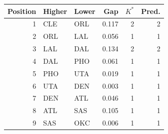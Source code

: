 \begin{tabular}{rllrrr}
\toprule
Position & Higher & Lower & Gap & $K^*$ & Pred. \\
\midrule
1 & CLE & ORL & 0.117 & 2 & 2 \\
2 & ORL & LAL & 0.056 & 1 & 1 \\
3 & LAL & DAL & 0.134 & 2 & 2 \\
4 & DAL & PHO & 0.061 & 1 & 1 \\
5 & PHO & UTA & 0.019 & 1 & 1 \\
6 & UTA & DEN & 0.003 & 1 & 1 \\
7 & DEN & ATL & 0.046 & 1 & 1 \\
8 & ATL & SAS & 0.105 & 1 & 1 \\
9 & SAS & OKC & 0.006 & 1 & 1 \\
\bottomrule
\end{tabular}
